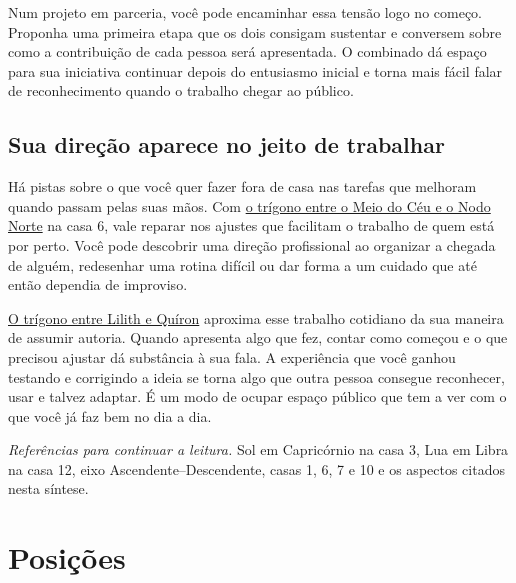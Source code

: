 \documentclass[11pt,a4paper]{article}
\newcommand{\aspectoref}[2]{\hyperref[#1]{#2}}
\begin{document}
Num projeto em parceria, você pode encaminhar essa tensão logo no começo. Proponha uma primeira etapa que os dois consigam sustentar e conversem sobre como a contribuição de cada pessoa será apresentada. O combinado dá espaço para sua iniciativa continuar depois do entusiasmo inicial e torna mais fácil falar de reconhecimento quando o trabalho chegar ao público.

\subsection{Sua direção aparece no jeito de trabalhar}

Há pistas sobre o que você quer fazer fora de casa nas tarefas que melhoram quando passam pelas suas mãos. Com \aspectoref{aspecto:mc-nodo}{o trígono entre o Meio do Céu e o Nodo Norte} na casa 6, vale reparar nos ajustes que facilitam o trabalho de quem está por perto. Você pode descobrir uma direção profissional ao organizar a chegada de alguém, redesenhar uma rotina difícil ou dar forma a um cuidado que até então dependia de improviso.

\aspectoref{aspecto:lilith-quiron}{O trígono entre Lilith e Quíron} aproxima esse trabalho cotidiano da sua maneira de assumir autoria. Quando apresenta algo que fez, contar como começou e o que precisou ajustar dá substância à sua fala. A experiência que você ganhou testando e corrigindo a ideia se torna algo que outra pessoa consegue reconhecer, usar e talvez adaptar. É um modo de ocupar espaço público que tem a ver com o que você já faz bem no dia a dia.

\medskip
{\small\textit{Referências para continuar a leitura.} Sol em Capricórnio na casa 3, Lua em Libra na casa 12, eixo Ascendente--Descendente, casas 1, 6, 7 e 10 e os aspectos citados nesta síntese.}

\clearpage

\section{Posições}
\end{document}
